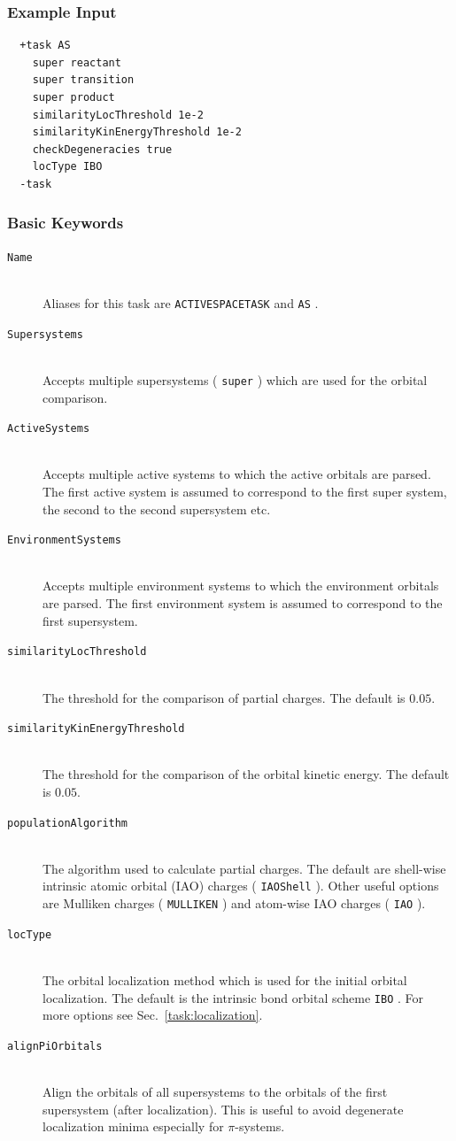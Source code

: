 \documentclass[bibliography=totocnumbered,a4paper,10pt,oneside]{scrbook}
\newcommand{\ttt}[1]{%
  \begingroup\setlength{\fboxsep}{1pt}%
  \colorbox{serenity-green!30}{\texttt{\hspace*{2pt}\vphantom{(g}#1\hspace*{2pt}}}%
  \endgroup
}
\begin{document}
\subsubsection{Example Input}
\begin{lstlisting}
  +task AS
    super reactant  
    super transition
    super product
    similarityLocThreshold 1e-2
    similarityKinEnergyThreshold 1e-2
    checkDegeneracies true
    locType IBO
  -task
 \end{lstlisting}
\subsubsection{Basic Keywords}
\begin{description}
 \item [\texttt{Name}]\hfill \\
 Aliases for this task are \ttt{ACTIVESPACETASK} and \ttt{AS}.  
 \item [\texttt{Supersystems}]\hfill \\
 Accepts multiple supersystems (\ttt{super}) which are used for the orbital comparison.   
 \item [\texttt{ActiveSystems}]\hfill \\
 Accepts multiple active systems to which the active orbitals are parsed. The first
 active system is assumed to correspond to the first super system, the second to the second
 supersystem etc. 
 \item [\texttt{EnvironmentSystems}]\hfill \\
 Accepts multiple environment systems to which the environment orbitals are parsed. The first
 environment system is assumed to correspond to the first supersystem. 
 \item [\texttt{similarityLocThreshold}]\hfill \\
 The threshold for the comparison of partial charges. The default is $0.05$.
 \item [\texttt{similarityKinEnergyThreshold}]\hfill \\
 The threshold for the comparison of the orbital kinetic energy. The default is $0.05$.
 \item [\texttt{populationAlgorithm}]\hfill \\
 The algorithm used to calculate partial charges. The default are shell-wise intrinsic atomic orbital (IAO)
 charges (\ttt{IAOShell}). Other useful options are Mulliken charges (\ttt{MULLIKEN}) and atom-wise IAO
 charges (\ttt{IAO}).
 \item [\texttt{locType}]\hfill \\
 The orbital localization method which is used for the initial orbital localization. The default is the
 intrinsic bond orbital scheme \ttt{IBO}. For more options see Sec.~\ref{task:localization}.
 \item [\texttt{alignPiOrbitals}]\hfill \\
 Align the orbitals of all supersystems to the orbitals of the first supersystem (after localization). This
 is useful to avoid degenerate localization minima especially for $\pi$-systems. 
\end{description}
\end{document}
